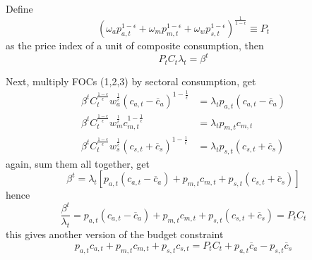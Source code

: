 \documentclass[10pt,landscape,a4paper]{article}
\let\bar\overline
\begin{document}
\begin{multicols*}{3}
Define
$$\left(\omega_ap_{a,t}^{1-\epsilon} +\omega_m p_{m,t}^{1-\epsilon} +\omega_w p_{s,t}^{1-\epsilon}\right)^{\frac{1}{1-\epsilon}}\equiv P_t$$ 
as the price index of a unit of composite consumption, then 
$$
P_tC_t\lambda_t = \beta^t 
$$

Next, multiply FOCs (1,2,3) by sectoral consumption, get 
\begin{align*}
    \beta^t C_t^{\frac{1-\epsilon}{\epsilon}}w_a^{\frac{1}{\epsilon}}\left(c_{a,t}-\bar{c}_a\right)^{1-\frac{1}{\epsilon}} & =\lambda_t  p_{a,t}(c_{a,t}-\bar{c}_a)\\
    \beta^t C_t^{\frac{1-\epsilon}{\epsilon}}w_m^{\frac{1}{\epsilon}}c_{m,t}^{1-\frac{1}{\epsilon}} & =\lambda_t p_{m,t}c_{m,t}\\ 
    \beta^t C_t^{\frac{1-\epsilon}{\epsilon}}w_s^{\frac{1}{\epsilon}}\left(c_{s,t}+\bar{c}_s\right)^{1-\frac{1}{\epsilon}} & =\lambda_t p_{s,t}(c_{s,t}+\bar{c}_s)
\end{align*}
again, sum them all together, get
$$
\beta^t = \lambda_t \left[ p_{a,t}\left(c_{a,t}-\bar{c}_a\right)+p_{m,t}c_{m,t}+p_{s,t}\left(c_{s,t}+\bar{c}_s\right) \right]
$$
hence
$$
\frac{\beta^t}{\lambda_t} = p_{a,t}\left(c_{a,t}-\bar{c}_a\right)+p_{m,t}c_{m,t}+p_{s,t}\left(c_{s,t}+\bar{c}_s\right) = P_tC_t
$$
this gives another version of the budget constraint
$$
p_{a,t}c_{a,t}+p_{m,t}c_{m,t}+p_{s,t}c_{s,t} = P_tC_t +p_{a,t}\bar{c}_a -p_{s,t}\bar{c}_s
$$


\end{multicols*}
\end{document}
